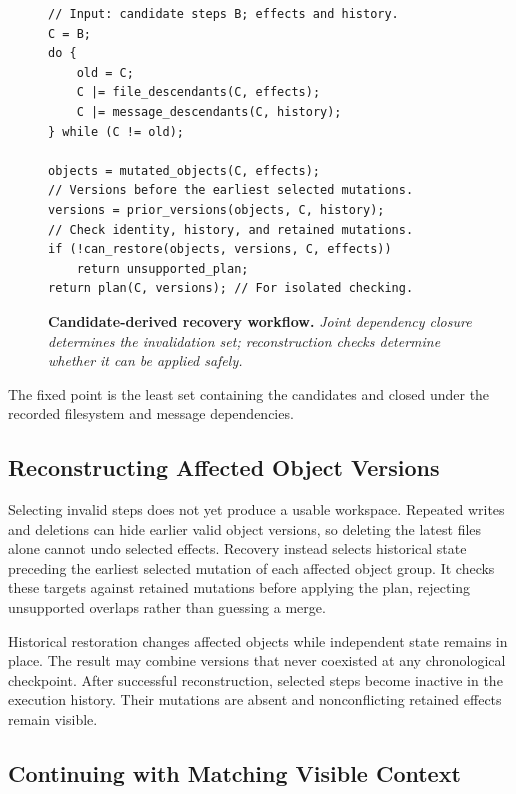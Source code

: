 \begin{figure}[t]
\centering
\begin{lstlisting}[style=lancetcode]
// Input: candidate steps B; effects and history.
C = B;
do {
    old = C;
    C |= file_descendants(C, effects);
    C |= message_descendants(C, history);
} while (C != old);

objects = mutated_objects(C, effects);
// Versions before the earliest selected mutations.
versions = prior_versions(objects, C, history);
// Check identity, history, and retained mutations.
if (!can_restore(objects, versions, C, effects))
    return unsupported_plan;
return plan(C, versions); // For isolated checking.
\end{lstlisting}
\caption{\textbf{Candidate-derived recovery workflow.}
\small\emph{Joint dependency closure determines the invalidation set;
reconstruction checks determine whether it can be applied safely.}}
\label{fig:recovery-workflow}
\end{figure}

The fixed point is the least set containing the candidates and closed under
the recorded filesystem and message dependencies.

\subsection{Reconstructing Affected Object Versions}
\label{sec:selective-reconstruction}

Selecting invalid steps does not yet produce a usable workspace.
Repeated writes and deletions can hide earlier valid object versions, so
deleting the latest files alone cannot undo selected effects.
Recovery instead selects historical state preceding the earliest selected
mutation of each affected object group.
It checks these targets against retained mutations before applying the
plan, rejecting unsupported overlaps rather than guessing a merge.

Historical restoration changes affected objects while independent state
remains in place.
The result may combine versions that never coexisted at any chronological
checkpoint.
After successful reconstruction, selected steps become inactive in the
execution history.
Their mutations are absent and nonconflicting retained effects remain visible.

\subsection{Continuing with Matching Visible Context}
\label{sec:context-reconstruction}


